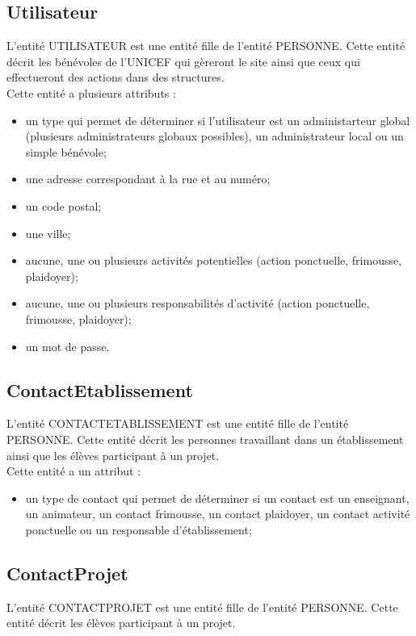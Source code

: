\documentclass[asi, sansVersion]{picInsa}
\begin{document}
\subsection*{Utilisateur}

L'entité UTILISATEUR est une entité fille de l'entité PERSONNE. Cette entité décrit les bénévoles de l'UNICEF qui gèreront le site ainsi que ceux qui effectueront des actions dans des structures. \\
Cette entité a plusieurs attributs : 
\begin{itemize} 
\item un type qui permet de déterminer si l'utilisateur est un administarteur global (plusieurs administrateurs globaux possibles), un administrateur local ou un simple bénévole;
\item une adresse correspondant à la rue et au numéro;
\item un code postal;
\item une ville;
\item aucune, une ou plusieurs activités potentielles (action ponctuelle, frimousse, plaidoyer); %
\item aucune, une ou plusieurs responsabilités d'activité (action ponctuelle, frimousse, plaidoyer);
\item un mot de passe. 
\end{itemize}

\subsection*{ContactEtablissement}

L'entité CONTACTETABLISSEMENT est une entité fille de l'entité PERSONNE. Cette entité décrit les personnes travaillant dans un établissement ainsi que les élèves participant à un projet. \\
Cette entité a un attribut : 
\begin{itemize}
\item un type de contact qui permet de déterminer si un contact est un enseignant, un animateur, un contact frimousse, un contact plaidoyer, un contact activité ponctuelle ou un responsable d'établissement; 
\end{itemize} 

\subsection*{ContactProjet}

L'entité CONTACTPROJET est une entité fille de l'entité PERSONNE. Cette entité décrit les élèves participant à un projet.
\end{document}
